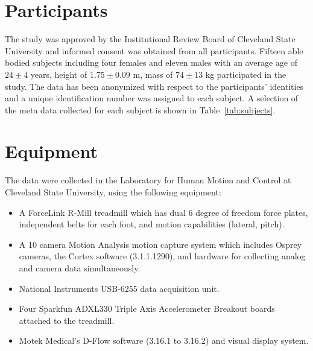 \documentclass[10pt,a4paper,twocolumn]{article}
\begin{document}
\section*{Participants}
The study was approved by the Institutional Review Board of Cleveland State University
and informed consent was obtained from all participants.
%
Fifteen able bodied subjects including four females and eleven males with an
average age of $24\pm4$ years, height of $1.75\pm0.09$ m, mass of $74\pm13$ kg
participated in the study. The data has been anonymized with respect to the
participants' identities and a unique identification number was assigned to
each subject. A selection of the meta data collected for each subject is shown
in Table~\ref{tab:subjects}.
%
\begin{table}
  \cprotect\caption{Information about the 15 participants. The final three
    columns give the trial numbers associated with each nominal treadmill
    speed. Additional trials with subject 0 are trials with no subject, i.e.
    unloaded trials that can be used for inertial compensation purposes, and are
    not shown in the table. Generated by \verb|src/subject_table.py|.}
  \centering
  
  \label{tab:subjects}
\end{table}

\section*{Equipment}
%
The data were collected in the Laboratory for Human Motion and Control at Cleveland State University,
using the following equipment:

\begin{itemize}
  \item A ForceLink R-Mill treadmill which has dual 6 degree of freedom force
    plates, independent belts for each foot, and motion capabilities (lateral,
    pitch).
  \item A 10 camera Motion Analysis motion capture system which includes Osprey
    cameras, the Cortex software (3.1.1.1290), and hardware for collecting
    analog and camera data simultaneously.
  \item National Instruments USB-6255 data acquisition unit.
  \item Four Sparkfun ADXL330 Triple Axis Accelerometer Breakout boards
    attached to the treadmill.
  \item Motek Medical’s D-Flow software (3.16.1 to 3.16.2) and visual display
    system.
\end{itemize}
\end{document}
